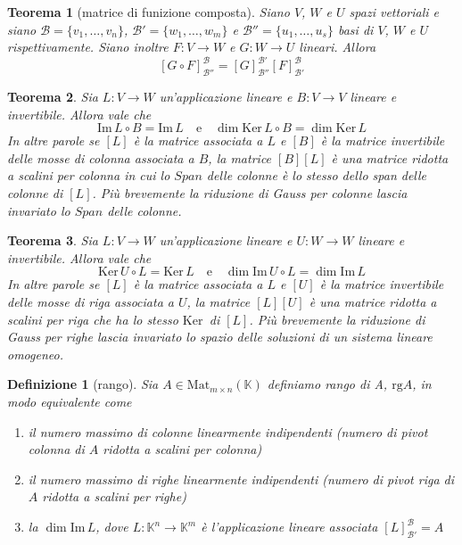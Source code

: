 \documentclass[9pt, a4paper]{article}
\newcommand{\K}{\mathbb{K}}
\newcommand{\Ker}{\mathrm{Ker}\,}
\newcommand{\Imm}{\mathrm{Im}\,}
\theoremstyle{mythm}
\newtheorem{definition}{Definizione}[section]
\newtheorem{thm}{Teorema}[section]
\begin{document}
\begin{thm}[matrice di funizione composta]
	Siano $ V $, $ W $ e $ U $ spazi vettoriali e siano \linebreak $ \mathscr{B} = \{v_1, \ldots, v_n\} $, $ \mathscr{B}' = \{w_1, \ldots, w_m\} $ e $ \mathscr{B}'' = \{u_1, \ldots, u_s\} $ basi di $ V $, $ W $ e $ U $ rispettivamente. Siano inoltre $ F \colon V \to W $ e $ G \colon W \to U $ lineari. Allora \[ \left [G \circ F \right ]_{\mathscr{B}''} ^{\mathscr{B}} = \left [G \right ]_{\mathscr{B}''} ^{\mathscr{B}'} \left [F \right ]_{\mathscr{B}'} ^{\mathscr{B}} \]
\end{thm}

\begin{thm}
	Sia $ L \colon V \to W $ un'applicazione lineare e $ B \colon V \to V $ lineare e invertibile. Allora vale che \[\Imm L \circ B = \Imm L \quad \mathrm{e} \quad \dim \Ker L \circ B = \dim  \Ker L\] In altre parole se $ \left [L \right ] $ è la matrice associata a $ L $ e $ \left [B \right ] $ è la matrice invertibile delle mosse di colonna associata a $ B $, la matrice $ \left [B \right ] \left [L \right ] $ è una matrice ridotta a scalini per colonna in cui lo $ Span $ delle colonne è lo stesso dello span delle colonne di $ \left [L \right ] $. Più brevemente la riduzione di Gauss per colonne lascia invariato lo $ Span $ delle colonne. 
\end{thm}

\begin{thm}
	Sia $ L \colon V \to W $ un'applicazione lineare e $ U \colon W \to W $ lineare e invertibile. Allora vale che \[\Ker U \circ L = \Ker L\quad \mathrm{e} \quad \dim \Imm U \circ L = \dim \Imm L  \] In altre parole se $ \left [L \right ] $ è la matrice associata a $ L $ e $ \left [U \right ] $ è la matrice invertibile delle mosse di riga associata a $ U $, la matrice $ \left [L \right ] \left [U \right ] $ è una matrice ridotta a scalini per riga che ha lo stesso $ \Ker $ di $ \left [L \right ] $. Più brevemente la riduzione di Gauss per righe lascia invariato lo spazio delle soluzioni di un sistema lineare omogeneo.
\end{thm}

\begin{definition}[rango]
	Sia $ A \in \mathrm{Mat}_{m \times n} (\K) $ definiamo rango di A, $ \mathrm{rg} A $, in modo equivalente come
	\begin{enumerate}
		\item il numero massimo di colonne linearmente indipendenti (numero di \emph{pivot} colonna di $ A $ ridotta a scalini per colonna)
		\item il numero massimo di righe linearmente indipendenti (numero di \emph{pivot} riga di $ A $ ridotta a scalini per righe)
		\item la $ \dim \Imm L $, dove $ L \colon \K^n \to \K^m $ è l'applicazione lineare associata $ \left [L \right ]_{\mathscr{B}'} ^{\mathscr{B}} = A $
	\end{enumerate}
\end{definition}
\end{document}
